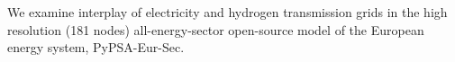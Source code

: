 We examine interplay of electricity and hydrogen transmission grids in the high
resolution (181 nodes) all-energy-sector open-source model of the European
energy system, PyPSA-Eur-Sec.